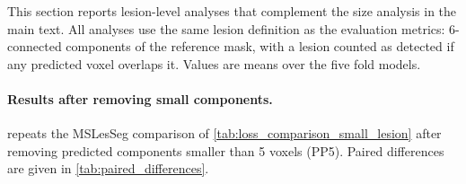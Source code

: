 This section reports lesion-level analyses that complement the size
analysis in the main text. All analyses use the same lesion definition as
the evaluation metrics: 6-connected components of the reference mask, with
a lesion counted as detected if any predicted voxel overlaps it. Values are
means over the five fold models.

\paragraph{Results after removing small components.}
 repeats the MSLesSeg comparison of
\cref{tab:loss_comparison_small_lesion} after removing predicted components
smaller than 5 voxels (PP5). Paired differences are given in
\cref{tab:paired_differences}.

\begin{table}[htbp]
\centering
\caption{Comparison of CATMIL with standard losses and the instance-level
loss CC-DiceCE on the MSLesSeg test set after post-processing with a
minimum connected-component size of 5 voxels (PP5). Best values are shown
in \textbf{bold}; second-best values are \underline{underlined}.}
\label{tab:loss_comparison_small_lesion_pp5}
\end{table}

